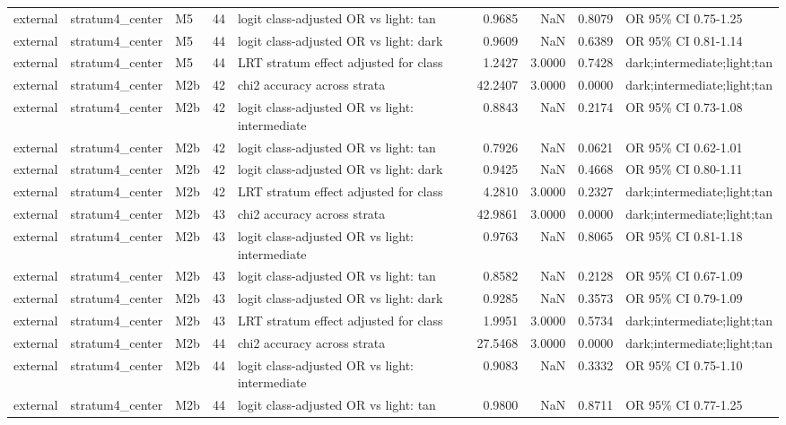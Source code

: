 \begin{tabular}{lllrlrrrl}
external & stratum4\_center & M5 & 44 & logit class-adjusted OR vs light: tan & 0.9685 & NaN & 0.8079 & OR 95\% CI 0.75-1.25 \\
external & stratum4\_center & M5 & 44 & logit class-adjusted OR vs light: dark & 0.9609 & NaN & 0.6389 & OR 95\% CI 0.81-1.14 \\
external & stratum4\_center & M5 & 44 & LRT stratum effect adjusted for class & 1.2427 & 3.0000 & 0.7428 & dark;intermediate;light;tan \\
external & stratum4\_center & M2b & 42 & chi2 accuracy across strata & 42.2407 & 3.0000 & 0.0000 & dark;intermediate;light;tan \\
external & stratum4\_center & M2b & 42 & logit class-adjusted OR vs light: intermediate & 0.8843 & NaN & 0.2174 & OR 95\% CI 0.73-1.08 \\
external & stratum4\_center & M2b & 42 & logit class-adjusted OR vs light: tan & 0.7926 & NaN & 0.0621 & OR 95\% CI 0.62-1.01 \\
external & stratum4\_center & M2b & 42 & logit class-adjusted OR vs light: dark & 0.9425 & NaN & 0.4668 & OR 95\% CI 0.80-1.11 \\
external & stratum4\_center & M2b & 42 & LRT stratum effect adjusted for class & 4.2810 & 3.0000 & 0.2327 & dark;intermediate;light;tan \\
external & stratum4\_center & M2b & 43 & chi2 accuracy across strata & 42.9861 & 3.0000 & 0.0000 & dark;intermediate;light;tan \\
external & stratum4\_center & M2b & 43 & logit class-adjusted OR vs light: intermediate & 0.9763 & NaN & 0.8065 & OR 95\% CI 0.81-1.18 \\
external & stratum4\_center & M2b & 43 & logit class-adjusted OR vs light: tan & 0.8582 & NaN & 0.2128 & OR 95\% CI 0.67-1.09 \\
external & stratum4\_center & M2b & 43 & logit class-adjusted OR vs light: dark & 0.9285 & NaN & 0.3573 & OR 95\% CI 0.79-1.09 \\
external & stratum4\_center & M2b & 43 & LRT stratum effect adjusted for class & 1.9951 & 3.0000 & 0.5734 & dark;intermediate;light;tan \\
external & stratum4\_center & M2b & 44 & chi2 accuracy across strata & 27.5468 & 3.0000 & 0.0000 & dark;intermediate;light;tan \\
external & stratum4\_center & M2b & 44 & logit class-adjusted OR vs light: intermediate & 0.9083 & NaN & 0.3332 & OR 95\% CI 0.75-1.10 \\
external & stratum4\_center & M2b & 44 & logit class-adjusted OR vs light: tan & 0.9800 & NaN & 0.8711 & OR 95\% CI 0.77-1.25 \\

\end{tabular}
